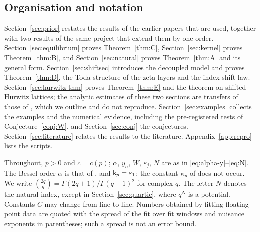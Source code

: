 \subsection{Organisation and notation}\label{sec:organisation}
Section~\ref{sec:prior} restates the results of the earlier papers that are used, together with two results of the
same project that extend them by one order. Section~\ref{sec:equilibrium} proves Theorem~\ref{thm:C},
Section~\ref{sec:kernel} proves Theorem~\ref{thm:B}, and Section~\ref{sec:natural} proves Theorem~\ref{thm:A} and its
general form. Section~\ref{sec:shiftsec} introduces the decoupled model and proves Theorem~\ref{thm:D}, the Toda
structure of the zeta layers and the index-shift law. Section~\ref{sec:hurwitz-thm} proves Theorem~\ref{thm:E} and the theorem on shifted Hurwitz
lattices; the analytic estimates of these two sections are transfers of those of \cite{PaperII}, which we outline and do not
reproduce. Section~\ref{sec:examples} collects the examples and the numerical evidence, including the pre-registered tests of
Conjecture~\ref{conj:W}, and Section~\ref{sec:conj} the conjectures. Section~\ref{sec:literature} relates the results to the
literature. Appendix~\ref{app:repro} lists the scripts.

Throughout, $p>0$ and $c=c(p)$; $\alpha$, $y_n$, $W$, $\varepsilon_j$, $N$ are as in \eqref{eq:alpha-y}--\eqref{eq:N}.
The Bessel order $\alpha$ is that of \cite{PaperII}, and $\mathsf k_p=\varepsilon_1$; the constant $\kappa_p$ of
\cite{PaperI} does not occur. We write $\binom{2q}{q}=\Gamma(2q+1)/\Gamma(q+1)^2$ for complex $q$. The letter $N$
denotes the natural index, except in Section~\ref{sec:quartic}, where $q^N$ is a potential. Constants $C$ may change
from line to line. Numbers obtained by fitting floating-point data are quoted with the spread of the fit over
fit windows and nuisance exponents in parentheses; such a spread is not an error bound.
